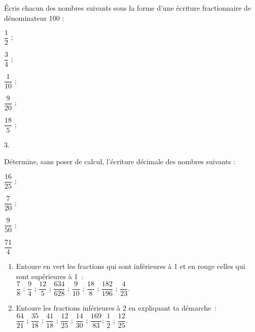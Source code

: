 \begin{exercice}[De dénominateur 100]
Écris chacun des nombres suivants sous la forme d'une écriture fractionnaire de dénominateur 100 :
\vspace{0.3em}
\begin{colenumerate}{3}
 \item $\dfrac{1}{2}$ \dotfill; 
 \vspace{0.2cm}
 \item $\dfrac{3}{4}$ \dotfill; 
 \item $\dfrac{1}{10}$ \dotfill; 
 \item $\dfrac{9}{20}$ \dotfill; 
 \item $\dfrac{18}{5}$ \dotfill; 
 \item 3.
 \end{colenumerate}
\end{exercice}


\begin{exercice}
Détermine, sans poser de calcul, l'écriture décimale des nombres suivants :
\begin{colenumerate}{4}
 \item $\dfrac{16}{25}$ ; 
 \item $\dfrac{7}{20}$ ; 
 \item $\dfrac{9}{50}$ ; 
 \item $\dfrac{71}{4}$
 \end{colenumerate}
\end{exercice}



\begin{exercice}
\begin{enumerate}
 \item Entoure en vert les fractions qui sont inférieures à 1 et en rouge celles qui sont supérieures à 1 : \\[0.5em]
 $\dfrac{7}{8}$ \quad ;  $\dfrac{9}{4}$ \quad ;  $\dfrac{12}{5}$ \quad ;  $\dfrac{634}{628}$ \quad;  $\dfrac{9}{10}$ \quad;  $\dfrac{18}{8}$ \quad;  $\dfrac{182}{196}$ \quad;  $\dfrac{4}{23}$.
 \vspace{0.2cm}
 \item Entoure les fractions inférieures à 2 en expliquant ta démarche : \\[0.5em]
 $\dfrac{64}{21}$ \quad ;  $\dfrac{35}{18}$ \quad ;  $\dfrac{41}{18}$ \quad ;  $\dfrac{12}{25}$ \quad;  $\dfrac{14}{30}$ \quad;  $\dfrac{169}{83}$\quad ;  $\dfrac{1}{2}$ \quad ;  $\dfrac{12}{25}$.
 \end{enumerate}
\end{exercice}


